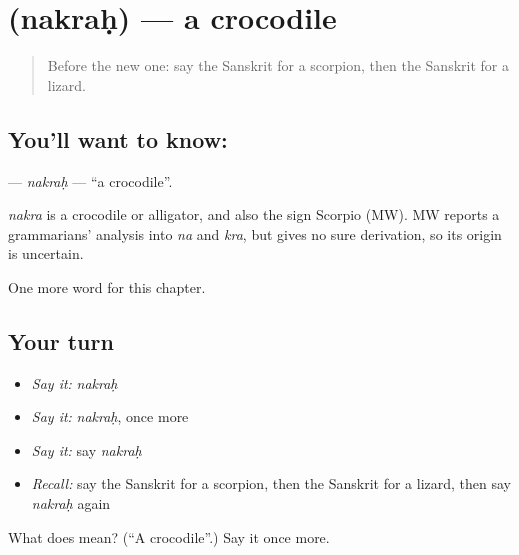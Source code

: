\section[\texorpdfstring{\sk{नक्रः} (nakraḥ)}{नक्रः (nakraḥ)}]{ (nakraḥ) — a crocodile}

\label{lesson:SA-C253-nakrah}



\begin{quote}
Before the new one: say the Sanskrit for a scorpion, then the Sanskrit for a lizard.
\end{quote}

\subsection*{You'll want to know: }
\textbf{} — \emph{nakraḥ} — \textquotedblleft{}a crocodile\textquotedblright{}.

\begin{cousinweb}
\emph{nakra} is a crocodile or alligator, and also the sign Scorpio (MW). MW reports a grammarians' analysis into \emph{na} and \emph{kra}, but gives no sure derivation, so its origin is uncertain.
\end{cousinweb}

\begin{grammarlens}[title={What you've built}]
One more word for this chapter.
\end{grammarlens}

\subsection*{Your turn}
\begin{itemize}
\raggedright
  \item \emph{Say it:} \emph{nakraḥ}
  \item \emph{Say it:} \emph{nakraḥ}, once more
  \item \emph{Say it:} say \emph{nakraḥ}
  \item \emph{Recall:} say the Sanskrit for a scorpion, then the Sanskrit for a lizard, then say \emph{nakraḥ} again
\end{itemize}

\begin{tcolorbox}[breakable,colback=teal!4,colframe=teal!35!black,title={Before you move on}]
What does  mean? (\textquotedblleft{}A crocodile\textquotedblright{}.) Say it once more.
\end{tcolorbox}
